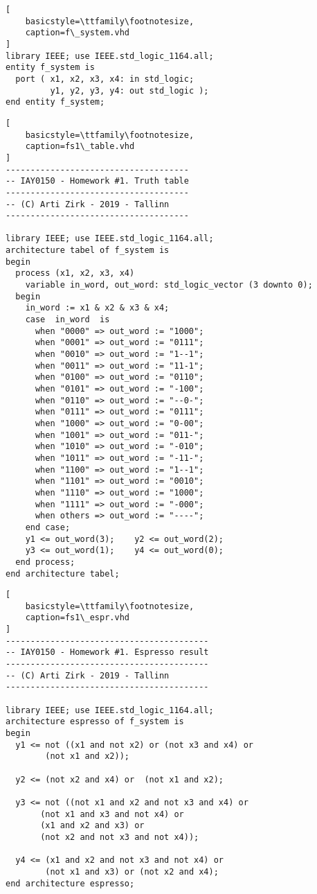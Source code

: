 \begin{lstlisting}[
    basicstyle=\ttfamily\footnotesize,
    caption=f\_system.vhd
]
library IEEE; use IEEE.std_logic_1164.all;
entity f_system is
  port ( x1, x2, x3, x4: in std_logic;
         y1, y2, y3, y4: out std_logic );
end entity f_system;
\end{lstlisting}

\begin{lstlisting}[
    basicstyle=\ttfamily\footnotesize,
    caption=fs1\_table.vhd
]
-------------------------------------
-- IAY0150 - Homework #1. Truth table
-------------------------------------
-- (C) Arti Zirk - 2019 - Tallinn
-------------------------------------

library IEEE; use IEEE.std_logic_1164.all;
architecture tabel of f_system is
begin
  process (x1, x2, x3, x4)
    variable in_word, out_word: std_logic_vector (3 downto 0);
  begin
    in_word := x1 & x2 & x3 & x4;
    case  in_word  is
      when "0000" => out_word := "1000";
      when "0001" => out_word := "0111";
      when "0010" => out_word := "1--1";
      when "0011" => out_word := "11-1";
      when "0100" => out_word := "0110";
      when "0101" => out_word := "-100";
      when "0110" => out_word := "--0-";
      when "0111" => out_word := "0111";
      when "1000" => out_word := "0-00";
      when "1001" => out_word := "011-";
      when "1010" => out_word := "-010";
      when "1011" => out_word := "-11-";
      when "1100" => out_word := "1--1";
      when "1101" => out_word := "0010";
      when "1110" => out_word := "1000";
      when "1111" => out_word := "-000";
      when others => out_word := "----";
    end case;
    y1 <= out_word(3);    y2 <= out_word(2);
    y3 <= out_word(1);    y4 <= out_word(0);
  end process;
end architecture tabel;
\end{lstlisting}

\begin{lstlisting}[
    basicstyle=\ttfamily\footnotesize,
    caption=fs1\_espr.vhd
]
-----------------------------------------
-- IAY0150 - Homework #1. Espresso result
-----------------------------------------
-- (C) Arti Zirk - 2019 - Tallinn
-----------------------------------------

library IEEE; use IEEE.std_logic_1164.all;
architecture espresso of f_system is
begin
  y1 <= not ((x1 and not x2) or (not x3 and x4) or
        (not x1 and x2));

  y2 <= (not x2 and x4) or  (not x1 and x2);

  y3 <= not ((not x1 and x2 and not x3 and x4) or 
       (not x1 and x3 and not x4) or
       (x1 and x2 and x3) or
       (not x2 and not x3 and not x4));

  y4 <= (x1 and x2 and not x3 and not x4) or
        (not x1 and x3) or (not x2 and x4);
end architecture espresso;
\end{lstlisting}

